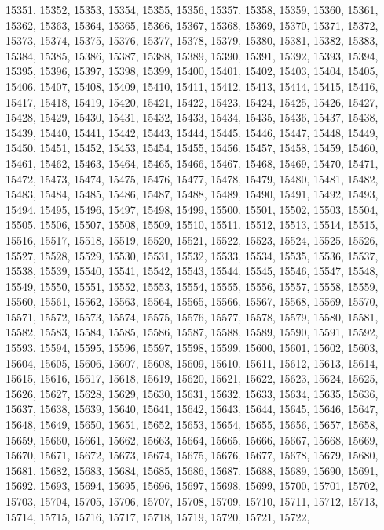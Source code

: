 15351,
15352,
15353,
15354,
15355,
15356,
15357,
15358,
15359,
15360,
15361,
15362,
15363,
15364,
15365,
15366,
15367,
15368,
15369,
15370,
15371,
15372,
15373,
15374,
15375,
15376,
15377,
15378,
15379,
15380,
15381,
15382,
15383,
15384,
15385,
15386,
15387,
15388,
15389,
15390,
15391,
15392,
15393,
15394,
15395,
15396,
15397,
15398,
15399,
15400,
15401,
15402,
15403,
15404,
15405,
15406,
15407,
15408,
15409,
15410,
15411,
15412,
15413,
15414,
15415,
15416,
15417,
15418,
15419,
15420,
15421,
15422,
15423,
15424,
15425,
15426,
15427,
15428,
15429,
15430,
15431,
15432,
15433,
15434,
15435,
15436,
15437,
15438,
15439,
15440,
15441,
15442,
15443,
15444,
15445,
15446,
15447,
15448,
15449,
15450,
15451,
15452,
15453,
15454,
15455,
15456,
15457,
15458,
15459,
15460,
15461,
15462,
15463,
15464,
15465,
15466,
15467,
15468,
15469,
15470,
15471,
15472,
15473,
15474,
15475,
15476,
15477,
15478,
15479,
15480,
15481,
15482,
15483,
15484,
15485,
15486,
15487,
15488,
15489,
15490,
15491,
15492,
15493,
15494,
15495,
15496,
15497,
15498,
15499,
15500,
15501,
15502,
15503,
15504,
15505,
15506,
15507,
15508,
15509,
15510,
15511,
15512,
15513,
15514,
15515,
15516,
15517,
15518,
15519,
15520,
15521,
15522,
15523,
15524,
15525,
15526,
15527,
15528,
15529,
15530,
15531,
15532,
15533,
15534,
15535,
15536,
15537,
15538,
15539,
15540,
15541,
15542,
15543,
15544,
15545,
15546,
15547,
15548,
15549,
15550,
15551,
15552,
15553,
15554,
15555,
15556,
15557,
15558,
15559,
15560,
15561,
15562,
15563,
15564,
15565,
15566,
15567,
15568,
15569,
15570,
15571,
15572,
15573,
15574,
15575,
15576,
15577,
15578,
15579,
15580,
15581,
15582,
15583,
15584,
15585,
15586,
15587,
15588,
15589,
15590,
15591,
15592,
15593,
15594,
15595,
15596,
15597,
15598,
15599,
15600,
15601,
15602,
15603,
15604,
15605,
15606,
15607,
15608,
15609,
15610,
15611,
15612,
15613,
15614,
15615,
15616,
15617,
15618,
15619,
15620,
15621,
15622,
15623,
15624,
15625,
15626,
15627,
15628,
15629,
15630,
15631,
15632,
15633,
15634,
15635,
15636,
15637,
15638,
15639,
15640,
15641,
15642,
15643,
15644,
15645,
15646,
15647,
15648,
15649,
15650,
15651,
15652,
15653,
15654,
15655,
15656,
15657,
15658,
15659,
15660,
15661,
15662,
15663,
15664,
15665,
15666,
15667,
15668,
15669,
15670,
15671,
15672,
15673,
15674,
15675,
15676,
15677,
15678,
15679,
15680,
15681,
15682,
15683,
15684,
15685,
15686,
15687,
15688,
15689,
15690,
15691,
15692,
15693,
15694,
15695,
15696,
15697,
15698,
15699,
15700,
15701,
15702,
15703,
15704,
15705,
15706,
15707,
15708,
15709,
15710,
15711,
15712,
15713,
15714,
15715,
15716,
15717,
15718,
15719,
15720,
15721,
15722,
